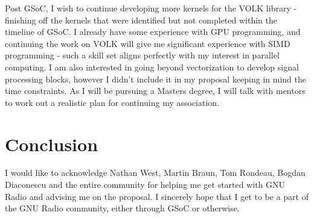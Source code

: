 \documentclass[a4paper,12pt,oneside]{article}
\begin{document}
Post GSoC, I wish to continue developing more kernels for the VOLK library - finishing off the kernels that were identified but not completed within the timeline of GSoC. I already have some experience with GPU programming, and continuing the work on VOLK will give me significant experience with SIMD programming - such a skill set aligns perfectly with my interest in parallel computing. I am also interested in going beyond vectorization to develop signal processing blocks, however I didn't include it in my proposal keeping in mind the time constraints. As I will be pursuing a Masters degree, I will talk with mentors to work out a realistic plan for continuing my association.
 
\section{Conclusion}
I would like to acknowledge Nathan West, Martin Braun, Tom Rondeau, Bogdan Diaconescu and the entire community for helping me get started with GNU Radio and advising me on the proposal. I sincerely hope that I get to be a part of the GNU Radio community, either through GSoC or otherwise. 


\end{document}
